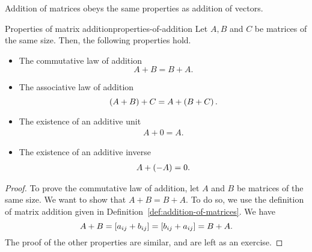 Addition of matrices obeys the same properties as addition of vectors.

\begin{theorem}{Properties of matrix addition}{properties-of-addition}
  Let $A,B$ and $C$ be matrices of the same size. Then, the following
  properties hold.

  \begin{itemize}
  \item The commutative law of addition
    \begin{equation*}
      A+B=B+A.
    \end{equation*}
  \item The associative law of addition
    \begin{equation*}
      \left(A+B\right)+C=A+\left(B+C\right).
    \end{equation*}
  \item The existence of an additive unit
    \begin{equation*}
      \begin{array}{c}
        A+0=A.
      \end{array}
    \end{equation*}
  \item The existence of an additive inverse
    \begin{equation*}
      \begin{array}{c}
        A+\left(-A\right) = 0.
      \end{array}
    \end{equation*}
  \end{itemize}
\end{theorem}

\begin{proof}
  To prove the commutative law of addition, let $A$ and $B$ be
  matrices of the same size. We want to show that $A+B=B+A$. To do so,
  we use the definition of matrix addition given in Definition~\ref{def:addition-of-matrices}.  We have
  \begin{equation*}
    A+B = \left[a_{ij}+b_{ij}\right] = \left[b_{ij}+a_{ij}\right] = B+A.
  \end{equation*}
  The proof of the other properties are similar, and are left as an
  exercise.
\end{proof}
